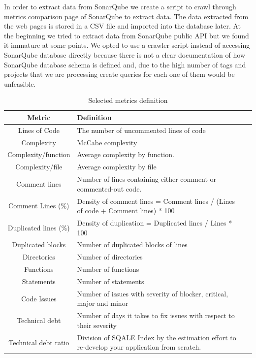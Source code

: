 In order to extract data from SonarQube we create a script to crawl through metrics comparison page of SonarQube to extract data. The data extracted from the web pages is stored in a CSV file and imported into the database later. At the beginning we tried to extract data from SonarQube public API but we found it immature at some points. We opted to use a crawler script instead of accessing SonarQube database directly because there is not a clear documentation of how SonarQube database schema is defined and, due to the high number of tags and projects that we are processing create queries for each one of them would be unfeasible. 

 \begin{table}[!hbt]
    \begin{center}
        \caption{Selected metrics definition}
        \label{tab:metrics_definition}
        \begin{tabular}{c| l l }
            \toprule
            \textbf{Metric} & \textbf{Definition} \\ \midrule
            Lines of Code & The number of uncommented lines of code    \\
            Complexity      & McCabe complexity    \\
            Complexity/function & Average complexity by function. \\
            Complexity/file & Average complexity by file \\
            Comment lines  & Number of lines containing either comment or commented-out code. \\
            Comment Lines (\%)   & Density of comment lines = Comment lines / (Lines of code + Comment lines) * 100    \\
            Duplicated lines (\%)     & Density of duplication = Duplicated lines / Lines * 100    \\
            Duplicated blocks   & Number of duplicated blocks of lines    \\
            Directories   & Number of directories    \\
            Functions         & Number of functions    \\
            Statements        & Number of statements   \\
            Code Issues       & Number of issues with severity of blocker, critical, major and minor   \\
            Technical debt    & Number of days it takes to fix issues with respect to their severity    \\
            Technical debt ratio   & Division of SQALE Index by the estimation effort to re-develop your application from scratch.    \\
        \end{tabular}
    \end{center}
 \end{table}

